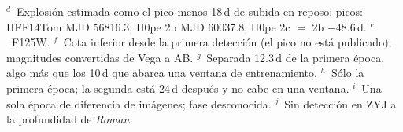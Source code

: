 \begin{table}
{$^{d}$~Explosión estimada como el pico menos 18\,d de subida en reposo; picos: HFF14Tom MJD 56816.3, H0pe 2b MJD 60037.8, H0pe 2c $=$ 2b $-48.6$\,d.
$^{e}$~F125W.
$^{f}$~Cota inferior desde la primera detección (el pico no está publicado); magnitudes convertidas de Vega a AB.
$^{g}$~Separada 12.3\,d de la primera época, algo más que los 10\,d que abarca una ventana de entrenamiento.
$^{h}$~Sólo la primera época; la segunda está 24\,d después y no cabe en una ventana.
$^{i}$~Una sola época de diferencia de imágenes; fase desconocida.
$^{j}$~Sin detección en ZYJ a la profundidad de \textit{Roman}.}
\end{table}
